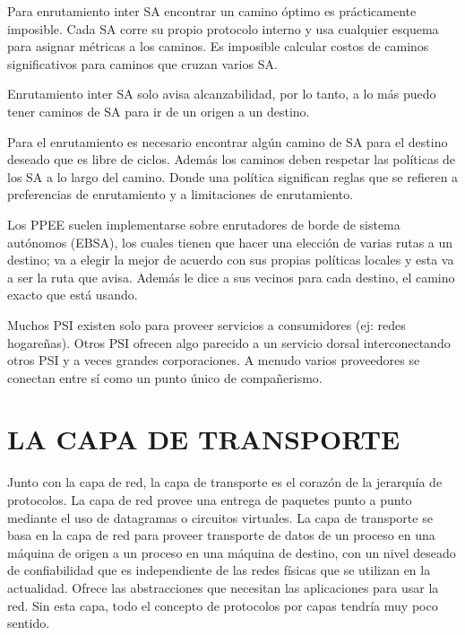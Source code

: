 \documentclass[10pt,a4paper]{report}
\begin{document}
	\par Para enrutamiento inter SA encontrar un camino óptimo es prácticamente 
	imposible. Cada SA corre su propio protocolo interno y usa cualquier esquema para 
	asignar métricas a los caminos. Es imposible calcular costos de caminos 
	significativos para caminos que cruzan varios SA.
	\par Enrutamiento inter SA solo avisa alcanzabilidad, por lo tanto, a lo más puedo 
	tener caminos de SA para ir de un origen a un destino.
	
	\par Para el enrutamiento es necesario encontrar algún camino de SA para el destino 
	deseado que es libre de ciclos. Además los caminos deben respetar las políticas de 
	los SA a lo largo del camino. Donde una política significan reglas que se refieren a 
	preferencias de enrutamiento y a limitaciones de enrutamiento.
   \par Los PPEE suelen implementarse sobre enrutadores de borde de sistema 
   autónomos (EBSA), los cuales tienen que hacer una elección de varias rutas a un 
   destino; va a elegir la mejor de acuerdo con sus propias políticas locales y esta va a 
   ser la ruta que avisa. Además le dice a sus vecinos para cada destino, el camino 
   exacto que está usando.
	\par Muchos PSI existen solo para proveer servicios a consumidores (ej: redes 
	hogareñas). Otros PSI ofrecen algo parecido a un servicio dorsal interconectando 
	otros PSI y a veces grandes corporaciones. A menudo varios proveedores se 
	conectan entre sí como un punto único de compañerismo.




\chapter{LA CAPA DE TRANSPORTE}
\par Junto con la capa de red, la capa de transporte es el corazón de la jerarquía de 
protocolos. La capa de red provee una entrega de paquetes punto a punto mediante 
el uso de datagramas o circuitos virtuales. La capa de transporte se basa en la capa 
de red para proveer transporte de datos de un proceso en una máquina de origen a 
un proceso en una máquina de destino, con un nivel deseado de confiabilidad que es 
independiente de las redes físicas que se utilizan en la actualidad. Ofrece las 
abstracciones que necesitan las aplicaciones para usar la red. Sin esta capa, todo el 
concepto de protocolos por capas tendría muy poco sentido.
\end{document}
